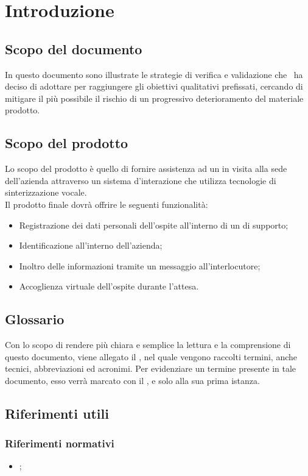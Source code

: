 \documentclass[../PianoDiQualifica.tex]{subfiles}
\begin{document}
\section{Introduzione}

	\subsection{Scopo del documento}
	In questo documento sono illustrate le strategie di verifica e validazione che \kpanic\ ha deciso di adottare per raggiungere gli obiettivi qualitativi prefissati, cercando di mitigare il più possibile il rischio di un progressivo deterioramento del materiale prodotto.
	
	\subsection{Scopo del prodotto}
	Lo scopo del prodotto è quello di fornire assistenza ad un  in visita alla sede dell'azienda attraverso un sistema d'interazione che utilizza tecnologie di sinterizzazione vocale.
	\\Il prodotto finale dovrà offrire le seguenti funzionalità:
	\begin{itemize}
		\item Registrazione dei dati personali dell'ospite all'interno di un  di supporto;
		\item Identificazione  all'interno dell'azienda;
		\item Inoltro delle informazioni tramite un messaggio  all'interlocutore;
		\item Accoglienza virtuale dell'ospite durante l'attesa.
	\end{itemize}

	\subsection{Glossario}
	Con lo scopo di rendere più chiara e semplice la lettura e la comprensione di questo documento, viene allegato il \glossariov, nel quale vengono raccolti termini, anche tecnici, abbreviazioni ed acronimi. Per evidenziare un termine presente in tale documento, esso verrà marcato con il , e solo alla sua prima istanza.
	
	\subsection{Riferimenti utili}
		\subsubsection{Riferimenti normativi}
		\begin{itemize}
			\item \textbf{\normediprogettov};
		\end{itemize}
	
\end{document}
